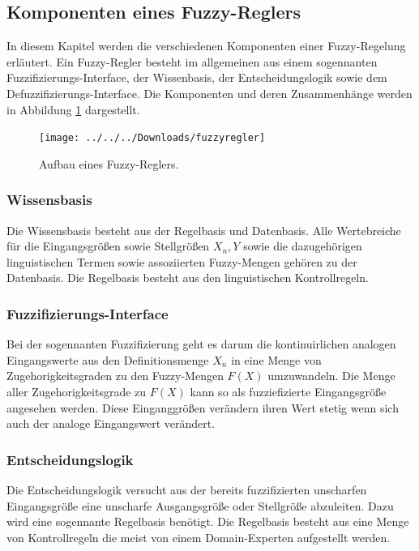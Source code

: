 \documentclass[12pt,a4paper,bibliography=totocnumbered,listof=totocnumbered]{scrartcl}
\theoremstyle{Umgebung}
\begin{document}
\subsection{Komponenten eines Fuzzy-Reglers}

In diesem Kapitel werden die verschiedenen Komponenten einer Fuzzy-Regelung erläutert. Ein Fuzzy-Regler besteht im allgemeinen aus einem sogennanten Fuzzifizierungs-Interface, der Wissenbasis, der Entscheidungslogik sowie dem Defuzzifizierungs-Interface. Die Komponenten und deren Zusammenhänge werden in Abbildung \ref{fig:fuzzyregler} dargestellt.

\begin{figure}
	\centering
	\texttt{[image: ../../../Downloads/fuzzyregler]}
	\caption{Aufbau eines Fuzzy-Reglers.}
	\label{fig:fuzzyregler}
\end{figure}

\subsubsection{Wissensbasis}

Die Wissensbasis besteht aus der Regelbasis und Datenbasis. Alle Wertebreiche für die Eingangsgrößen sowie Stellgrößen $X_n, Y$ sowie die dazugehörigen linguistischen Termen sowie assoziierten Fuzzy-Mengen gehören zu der Datenbasis. Die Regelbasis besteht aus den linguistischen Kontrollregeln.

\subsubsection{Fuzzifizierungs-Interface}

Bei der sogennanten Fuzzifizierung geht es darum die kontinuirlichen analogen Eingangswerte aus den Definitionsmenge $X_n$ in eine Menge von Zugehorigkeitsgraden zu den Fuzzy-Mengen $F(X)$ umzuwandeln. Die Menge aller Zugehorigkeitsgrade zu $F(X)$ kann so als fuzziefizierte Eingangsgröße angesehen werden. Diese Einganggrößen verändern ihren Wert stetig wenn sich auch der analoge Eingangswert verändert. 

\subsubsection{Entscheidungslogik}

Die Entscheidungslogik versucht aus der bereits fuzzifizierten unscharfen Eingangsgröße eine unscharfe Ausgangsgröße oder Stellgröße abzuleiten. Dazu wird eine sogennante Regelbasis benötigt. Die Regelbasis besteht aus eine Menge von Kontrollregeln die meist von einem Domain-Experten aufgestellt werden.
\end{document}
